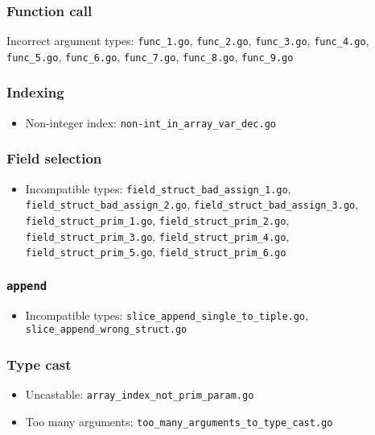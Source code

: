 \documentclass{article}
\begin{document}
\subsubsection*{Function call}

\item Incorrect argument types: \texttt{func_1.go}, \texttt{func_2.go}, \texttt{func_3.go}, \texttt{func_4.go}, \texttt{func_5.go}, \texttt{func_6.go}, \texttt{func_7.go}, \texttt{func_8.go}, \texttt{func_9.go}

\subsubsection*{Indexing}

\begin{itemize}
\item Non-integer index: \texttt{non-int_in_array_var_dec.go}

\end{itemize}

\subsubsection*{Field selection}

\begin{itemize}
\item Incompatible types: \texttt{field_struct_bad_assign_1.go}, \texttt{field_struct_bad_assign_2.go}, \texttt{field_struct_bad_assign_3.go}, \texttt{field_struct_prim_1.go}, \texttt{field_struct_prim_2.go}, \texttt{field_struct_prim_3.go}, \texttt{field_struct_prim_4.go}, \texttt{field_struct_prim_5.go}, \texttt{field_struct_prim_6.go}
\end{itemize}

\subsubsection*{\texttt{append}}

\begin{itemize}
\item Incompatible types: \texttt{slice_append_single_to_tiple.go}, \texttt{slice_append_wrong_struct.go}
\end{itemize}

\subsubsection*{Type cast}

\begin{itemize}
\item Uncastable: \texttt{array_index_not_prim_param.go}
\item Too many arguments: \texttt{too_many_arguments_to_type_cast.go}
\end{itemize}
\end{document}
